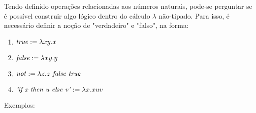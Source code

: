 \documentclass[../main.tex]{subfiles}
\begin{document}
Tendo definido operações relacionadas aos números naturais, pode-se perguntar se é possível construir algo lógico dentro do cálculo $\lambda$ não-tipado. Para isso, é necessário definir a noção de "verdadeiro" e "falso", na forma:

\begin{definition}[Booleanos]
    \hfill
    \begin{enumerate}
        \item $\text{\emph{true}} := \lambda xy . x$
        \item $\text{\emph{false}} := \lambda xy . y$
        \item $\text{\emph{not}} := \lambda z . z \text{\emph{ false }} \text{\emph{true }}$
        \item $\text{\emph{'if x then u else v'}} := \lambda x . xuv$
    \end{enumerate}
\end{definition}

Exemplos: 
\end{document}
